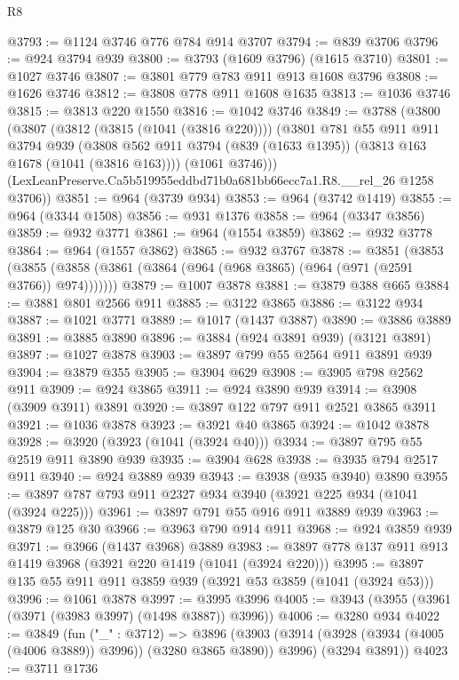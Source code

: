 \begin{lexlean}{R8}
\begin{coremodule}
@3793 := @1124 @3746 @776 @784 @914 @3707
@3794 := @839 @3706
@3796 := @924 @3794 @939
@3800 := @3793 (@1609 @3796) (@1615 @3710)
@3801 := @1027 @3746
@3807 := @3801 @779 @783 @911 @913 @1608 @3796
@3808 := @1626 @3746
@3812 := @3808 @778 @911 @1608 @1635
@3813 := @1036 @3746
@3815 := @3813 @220 @1550
@3816 := @1042 @3746
@3849 := @3788
    (@3800
      (@3807
        (@3812 (@3815 (@1041 (@3816 @220))))
        (@3801
          @781
          @55
          @911
          @911
          @3794
          @939
          (@3808 @562 @911 @3794 (@839 (@1633 @1395)) (@3813 @163 @1678 (@1041 (@3816 @163))))
          (@1061 @3746)))
      (LexLeanPreserve.Ca5b519955eddbd71b0a681bb66ecc7a1.R8.__rel_26 @1258 @3706))
@3851 := @964 (@3739 @934)
@3853 := @964 (@3742 @1419)
@3855 := @964 (@3344 @1508)
@3856 := @931 @1376
@3858 := @964 (@3347 @3856)
@3859 := @932 @3771
@3861 := @964 (@1554 @3859)
@3862 := @932 @3778
@3864 := @964 (@1557 @3862)
@3865 := @932 @3767
@3878 := @3851
    (@3853 (@3855 (@3858 (@3861 (@3864 (@964 (@968 @3865) (@964 (@971 (@2591 @3766)) @974)))))))
@3879 := @1007 @3878
@3881 := @3879 @388 @665
@3884 := @3881 @801 @2566 @911
@3885 := @3122 @3865
@3886 := @3122 @934
@3887 := @1021 @3771
@3889 := @1017 (@1437 @3887)
@3890 := @3886 @3889
@3891 := @3885 @3890
@3896 := @3884 (@924 @3891 @939) (@3121 @3891)
@3897 := @1027 @3878
@3903 := @3897 @799 @55 @2564 @911 @3891 @939
@3904 := @3879 @355
@3905 := @3904 @629
@3908 := @3905 @798 @2562 @911
@3909 := @924 @3865
@3911 := @924 @3890 @939
@3914 := @3908 (@3909 @3911) @3891
@3920 := @3897 @122 @797 @911 @2521 @3865 @3911
@3921 := @1036 @3878
@3923 := @3921 @40 @3865
@3924 := @1042 @3878
@3928 := @3920 (@3923 (@1041 (@3924 @40)))
@3934 := @3897 @795 @55 @2519 @911 @3890 @939
@3935 := @3904 @628
@3938 := @3935 @794 @2517 @911
@3940 := @924 @3889 @939
@3943 := @3938 (@935 @3940) @3890
@3955 := @3897 @787 @793 @911 @2327 @934 @3940 (@3921 @225 @934 (@1041 (@3924 @225)))
@3961 := @3897 @791 @55 @916 @911 @3889 @939
@3963 := @3879 @125 @30
@3966 := @3963 @790 @914 @911
@3968 := @924 @3859 @939
@3971 := @3966 (@1437 @3968) @3889
@3983 := @3897 @778 @137 @911 @913 @1419 @3968 (@3921 @220 @1419 (@1041 (@3924 @220)))
@3995 := @3897 @135 @55 @911 @911 @3859 @939 (@3921 @53 @3859 (@1041 (@3924 @53)))
@3996 := @1061 @3878
@3997 := @3995 @3996
@4005 := @3943 (@3955 (@3961 (@3971 (@3983 @3997) (@1498 @3887)) @3996))
@4006 := @3280 @934
@4022 := @3849
    (fun ("_" : @3712) =>
    @3896
      (@3903 (@3914 (@3928 (@3934 (@4005 (@4006 @3889)) @3996)) (@3280 @3865 @3890)) @3996)
      (@3294 @3891))
@4023 := @3711 @1736

\end{coremodule}
\end{lexlean}
